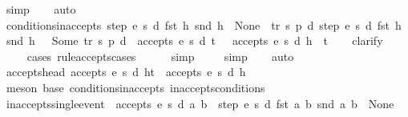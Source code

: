 \begin{isabellebody}
\ simp\isanewline
\ \ \isamarkupfalse%
\ auto%
\endisatagproof
{\isafoldproof}%
%
\isadelimproof
\isanewline
%
\endisadelimproof
\isanewline
{}\isamarkupfalse%
\ conditions{\isacharunderscore}inaccepts{\isacharcolon}\ {\isachardoublequoteopen}step\ e\ s\ d\ {\isacharparenleft}fst\ h{\isacharparenright}\ {\isacharparenleft}snd\ h{\isacharparenright}\ {\isacharequal}\ None\ {\isasymor}\ {\isacharparenleft}{\isasymexists}tr\ s{\isacharprime}\ p{\isacharprime}\ d{\isacharprime}{\isachardot}\ step\ e\ s\ d\ {\isacharparenleft}fst\ h{\isacharparenright}\ {\isacharparenleft}snd\ h{\isacharparenright}\ {\isacharequal}\ \ Some\ {\isacharparenleft}tr{\isacharcomma}\ s{\isacharprime}{\isacharcomma}\ p{\isacharprime}{\isacharcomma}\ d{\isacharprime}{\isacharparenright}\ {\isasymand}\ {\isasymnot}accepts\ e\ s{\isacharprime}\ d{\isacharprime}\ t{\isacharparenright}\ {\isasymLongrightarrow}\ {\isasymnot}\ accepts\ e\ s\ d\ {\isacharparenleft}h\ {\isacharhash}\ t{\isacharparenright}{\isachardoublequoteclose}\isanewline
%
\isadelimproof
\ \ %
\endisadelimproof
%
\isatagproof
{}\isamarkupfalse%
\ clarify\isanewline
\ \ \ \ \isamarkupfalse%
{\isacharparenleft}cases\ rule{\isacharcolon}accepts{\isachardot}cases{\isacharparenright}\isanewline
\ \ \ \ \isamarkupfalse%
\ simp\isanewline
\ \ \ \isamarkupfalse%
\ simp\isanewline
\ \ \isamarkupfalse%
\ auto%
\endisatagproof
{\isafoldproof}%
%
\isadelimproof
\isanewline
%
\endisadelimproof
\isanewline
{}\isamarkupfalse%
\ accepts{\isacharunderscore}head{\isacharcolon}\ {\isachardoublequoteopen}accepts\ e\ s\ d\ {\isacharparenleft}h{\isacharhash}t{\isacharparenright}\ {\isasymLongrightarrow}\ accepts\ e\ s\ d\ {\isacharbrackleft}h{\isacharbrackright}{\isachardoublequoteclose}\isanewline
%
\isadelimproof
\ \ %
\endisadelimproof
%
\isatagproof
{}\isamarkupfalse%
\ {\isacharparenleft}meson\ base\ conditions{\isacharunderscore}inaccepts\ inaccepts{\isacharunderscore}conditions{\isacharparenright}%
\endisatagproof
{\isafoldproof}%
%
\isadelimproof
\isanewline
%
\endisadelimproof
\isanewline
{}\isamarkupfalse%
\ inaccepts{\isacharunderscore}single{\isacharunderscore}event{\isacharcolon}\ {\isachardoublequoteopen}{\isasymnot}\ accepts\ e\ s\ d\ {\isacharbrackleft}{\isacharparenleft}a{\isacharcomma}\ b{\isacharparenright}{\isacharbrackright}\ {\isasymLongrightarrow}\ step\ e\ s\ d\ {\isacharparenleft}fst\ {\isacharparenleft}a{\isacharcomma}\ b{\isacharparenright}{\isacharparenright}\ {\isacharparenleft}snd\ {\isacharparenleft}a{\isacharcomma}\ b{\isacharparenright}{\isacharparenright}\ {\isacharequal}\ None{\isachardoublequoteclose}\isanewline

\end{isabellebody}
